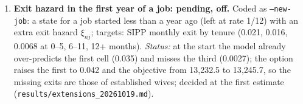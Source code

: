 \documentclass[11pt]{article}
\newcommand{\code}[1]{\texttt{#1}}
\newcommand{\1}{\mathbf{1}}
\begin{document}
\begin{enumerate}[label=\textbf{D\arabic*.}, ref=D\arabic*, leftmargin=*]
  13{,}162.8; decided at the first estimate on that set.
  \item \label{od:newjob} \textbf{Exit hazard in the first year of a job: pending, off.} Coded as \code{--new-job}: a
  state for a job started less than a year ago (left at rate 1/12) with an extra exit hazard $\xi_{nj}$; targets: SIPP
  monthly exit by tenure (0.021, 0.016, 0.0068 at 0--5, 6--11, 12+ months). \emph{Status:} at the start the model
  already over-predicts the first cell (0.035) and misses the third (0.0027); the option raises the first to 0.042 and
  the objective from 13{,}232.5 to 13{,}245.7, so the missing exits are those of established wives; decided at the first
  estimate (\code{results/extensions\_20261019.md}).
\end{enumerate}



\end{document}

